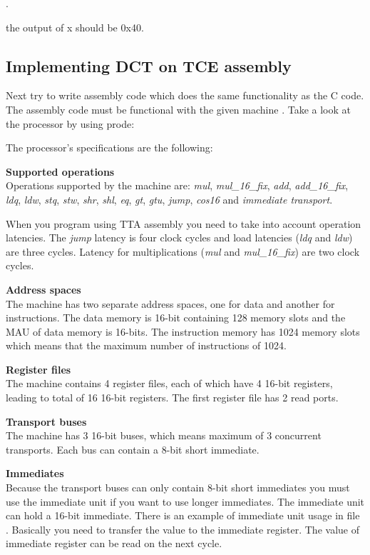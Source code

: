 \documentclass[twoside]{tceusermanual}
\begin{document}
. 

the output of x should be 0x40.

\subsection{Implementing DCT on TCE assembly}

Next try to write assembly code which does the same functionality as the
C code. The assembly code must be functional with the given machine
. Take a look at the processor by
using prode:


The processor's specifications are the following:

\textbf{Supported operations} \\
Operations supported by the machine are: \textit{mul}, \textit{mul\_16\_fix},
\textit{add}, \textit{add\_16\_fix}, \textit{ldq}, \textit{ldw}, \textit{stq},
\textit{stw}, \textit{shr}, \textit{shl}, \textit{eq}, \textit{gt},
\textit{gtu}, \textit{jump}, \textit{cos16} and \textit{immediate transport}.

When you program using TTA assembly you need to take into account 
operation latencies. The \textit{jump} latency is four clock cycles and load
latencies (\textit{ldq} and \textit{ldw}) are three cycles. Latency for
multiplications (\textit{mul} and \textit{mul\_16\_fix}) are two clock cycles.

\textbf{Address spaces} \\
The machine has two separate address spaces, one for data and another for
instructions. The data memory is 16-bit containing 128 memory slots and the
MAU of data memory is 16-bits. The instruction memory has 1024 memory slots
which means that the maximum number of instructions of 1024.

\textbf{Register files} \\
The machine contains 4 register files, each of which have 4 16-bit registers,
leading to total of 16 16-bit registers.  The first register file
has 2 read ports.

\textbf{Transport buses} \\
The machine has 3 16-bit buses, which means maximum of 3 concurrent
transports. Each bus can contain a 8-bit short immediate.

\textbf{Immediates} \\
Because the transport buses can only contain 8-bit short immediates you must
use the immediate unit if you want to use longer immediates. The immediate unit
can hold a 16-bit immediate. There is an example of immediate unit usage in
file . Basically you need to transfer the value to the
immediate register. The value of immediate register can be read on the next
cycle.
\end{document}
